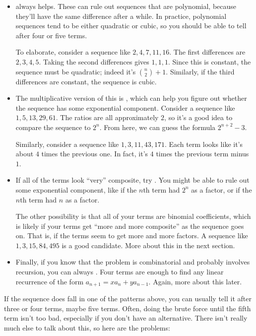 \documentclass[11pt,paper=letter]{scrartcl}
\begin{document}
\begin{itemize}
  \item {} always helps. These can rule out sequences that are polynomial, because they'll have the same difference after a while. In practice, polynomial sequences tend to be either quadratic or cubic, so you should be able to tell after four or five terms.

  To elaborate, consider a sequence like $2, 4, 7, 11, 16$. The first differences are $2, 3, 4, 5$. Taking the second differences gives $1, 1, 1$. Since this is constant, the sequence must be quadratic; indeed it's $\binom{n}{2} + 1$. Similarly, if the third differences are constant, the sequence is cubic.

  \item The multiplicative version of this is , which can help you figure out whether the sequence has some exponential component. Consider a sequence like $1, 5, 13, 29, 61$. The ratios are all approximately $2$, so it's a good idea to compare the sequence to $2^n$. From here, we can guess the formula $2^{n + 2} - 3$.

  Similarly, consider a sequence like $1, 3, 11, 43, 171$. Each term looks like it's about $4$ times the previous one. In fact, it's $4$ times the previous term minus $1$.

  \item If all of the terms look ``very'' composite, try . You might be able to rule out some exponential component, like if the $n$th term had $2^n$ as a factor, or if the $n$th term had $n$ as a factor.

  The other possibility is that all of your terms are binomial coefficients, which is likely if your terms get ``more and more composite'' as the sequence goes on. That is, if the terms seem to get more and more factors. A sequence like $1, 3, 15, 84, 495$ is a good candidate. More about this in the next section.

  \item Finally, if you know that the problem is combinatorial and probably involves recursion, you can always . Four terms are enough to find any linear recurrence of the form $a_{n+1} = xa_n + ya_{n-1}$. Again, more about this later.
\end{itemize}

If the sequence does fall in one of the patterns above, you can usually tell it after three or four terms, maybe five terms. Often, doing the brute force until the fifth term isn't too bad, especially if you don't have an alternative. There isn't really much else to talk about this, so here are the problems:
\end{document}
